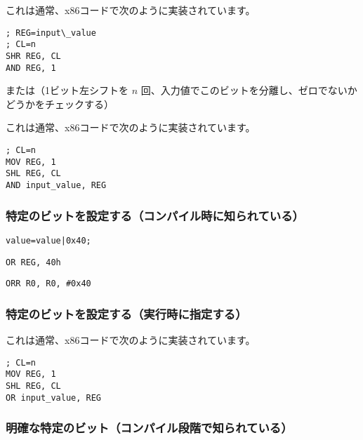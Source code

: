 これは通常、x86コードで次のように実装されています。

\begin{lstlisting}[caption=x86,style=customasmx86]
; REG=input\_value
; CL=n
SHR REG, CL
AND REG, 1
\end{lstlisting}

または（1ビット左シフトを $n$ 回、入力値でこのビットを分離し、ゼロでないかどうかをチェックする）



これは通常、x86コードで次のように実装されています。

\begin{lstlisting}[caption=x86,style=customasmx86]
; CL=n
MOV REG, 1
SHL REG, CL
AND input_value, REG
\end{lstlisting}

\subsubsection{特定のビットを設定する（コンパイル時に知られている）}

\begin{lstlisting}[caption=\CCpp]
value=value|0x40;
\end{lstlisting}

\begin{lstlisting}[caption=x86,style=customasmx86]
OR REG, 40h
\end{lstlisting}

\begin{lstlisting}[caption=ARM (\ARMMode) and ARM64,style=customasmARM]
ORR R0, R0, #0x40
\end{lstlisting}

\subsubsection{特定のビットを設定する（実行時に指定する）}



これは通常、x86コードで次のように実装されています。

\begin{lstlisting}[caption=x86,style=customasmx86]
; CL=n
MOV REG, 1
SHL REG, CL
OR input_value, REG
\end{lstlisting}

\subsubsection{明確な特定のビット（コンパイル段階で知られている）}

